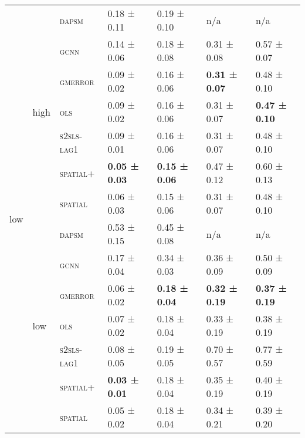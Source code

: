 \documentclass{article}
\begin{document}
\begin{table}[!tbp]
\begin{tabular}{lllllll}
\cline{1-7} \cline{2-7}
\multirow[t]{14}{*}{low} & \multirow[t]{7}{*}{high} & \textsc{dapsm} & 0.18 ± {\small 0.11} & 0.19 ± {\small 0.10} & n/a & n/a \\
 &  & \textsc{gcnn} & 0.14 ± {\small 0.06} & 0.18 ± {\small 0.08} & 0.31 ± {\small 0.08} & 0.57 ± {\small 0.07} \\
 &  & \textsc{gmerror} & 0.09 ± {\small 0.02} & 0.16 ± {\small 0.06} & \bf 0.31 ± {\small 0.07} & 0.48 ± {\small 0.10} \\
 &  & \textsc{ols} & 0.09 ± {\small 0.02} & 0.16 ± {\small 0.06} & 0.31 ± {\small 0.07} & \bf 0.47 ± {\small 0.10} \\
 &  & \textsc{s2sls-lag1} & 0.09 ± {\small 0.01} & 0.16 ± {\small 0.06} & 0.31 ± {\small 0.07} & 0.48 ± {\small 0.10} \\
 &  & \textsc{spatial+} & \bf 0.05 ± {\small 0.03} & \bf 0.15 ± {\small 0.06} & 0.47 ± {\small 0.12} & 0.60 ± {\small 0.13} \\
 &  & \textsc{spatial} & 0.06 ± {\small 0.03} & 0.15 ± {\small 0.06} & 0.31 ± {\small 0.07} & 0.48 ± {\small 0.10} \\
\cline{2-7}
 & \multirow[t]{7}{*}{low} & \textsc{dapsm} & 0.53 ± {\small 0.15} & 0.45 ± {\small 0.08} & n/a & n/a \\
 &  & \textsc{gcnn} & 0.17 ± {\small 0.04} & 0.34 ± {\small 0.03} & 0.36 ± {\small 0.09} & 0.50 ± {\small 0.09} \\
 &  & \textsc{gmerror} & 0.06 ± {\small 0.02} & \bf 0.18 ± {\small 0.04} & \bf 0.32 ± {\small 0.19} & \bf 0.37 ± {\small 0.19} \\
 &  & \textsc{ols} & 0.07 ± {\small 0.02} & 0.18 ± {\small 0.04} & 0.33 ± {\small 0.19} & 0.38 ± {\small 0.19} \\
 &  & \textsc{s2sls-lag1} & 0.08 ± {\small 0.05} & 0.19 ± {\small 0.05} & 0.70 ± {\small 0.57} & 0.77 ± {\small 0.59} \\
 &  & \textsc{spatial+} & \bf 0.03 ± {\small 0.01} & 0.18 ± {\small 0.04} & 0.35 ± {\small 0.19} & 0.40 ± {\small 0.19} \\
 &  & \textsc{spatial} & 0.05 ± {\small 0.02} & 0.18 ± {\small 0.04} & 0.34 ± {\small 0.21} & 0.39 ± {\small 0.20} \\
\cline{1-7} \cline{2-7}
\bottomrule
\end{tabular}

\end{table}
\end{document}
